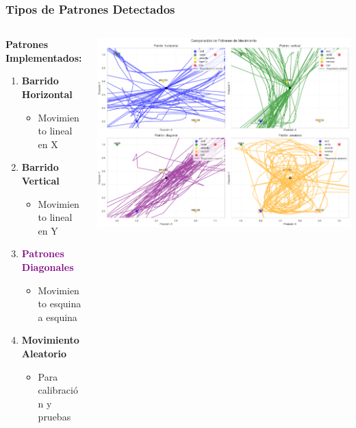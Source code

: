 \documentclass[xcolor=dvipsnames]{beamer}
\begin{document}
\begin{frame}
    \frametitle{Tipos de Patrones Detectados}
    \begin{columns}
        \begin{column}{0.5\textwidth}
            \textbf{Patrones Implementados:}
            \begin{enumerate}
                \item \textcolor{UniBlue}{\textbf{Barrido Horizontal}}
                \begin{itemize}
                    \item Movimiento lineal en X
                \end{itemize}
                
                \item \textcolor{UniGreen}{\textbf{Barrido Vertical}}
                \begin{itemize}
                    \item Movimiento lineal en Y
                \end{itemize}
                
                \item \textcolor{Purple}{\textbf{Patrones Diagonales}}
                \begin{itemize}
                    \item Movimiento esquina a esquina
                \end{itemize}
                
                \item \textcolor{UniOrange}{\textbf{Movimiento Aleatorio}}
                \begin{itemize}
                    \item Para calibración y pruebas
                \end{itemize}
            \end{enumerate}
        \end{column}
        \begin{column}{0.5\textwidth}
            \begin{center}
                \includegraphics[width=\textwidth]{../assets/result.png}
                

\end{center}
\end{column}
\end{columns}
\end{frame}
\end{document}
